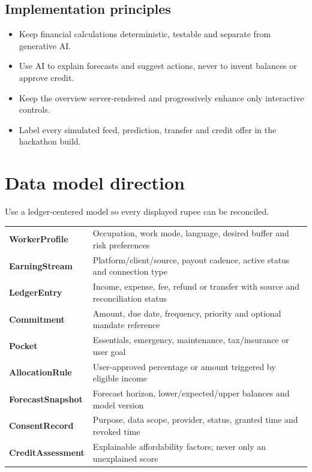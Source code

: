 \documentclass[10pt,a4paper]{article}
\begin{document}
\subsection{Implementation principles}

\begin{itemize}
  \item Keep financial calculations deterministic, testable and separate from generative AI.
  \item Use AI to explain forecasts and suggest actions, never to invent balances or approve credit.
  \item Keep the overview server-rendered and progressively enhance only interactive controls.
  \item Label every simulated feed, prediction, transfer and credit offer in the hackathon build.
\end{itemize}

\newpage
\section{Data model direction}

Use a ledger-centered model so every displayed rupee can be reconciled.

\begin{tabularx}{\textwidth}{>{\bfseries\color{Accent}}p{38mm} X}
WorkerProfile & Occupation, work mode, language, desired buffer and risk preferences \\
EarningStream & Platform/client/source, payout cadence, active status and connection type \\
LedgerEntry & Income, expense, fee, refund or transfer with source and reconciliation status \\
Commitment & Amount, due date, frequency, priority and optional mandate reference \\
Pocket & Essentials, emergency, maintenance, tax/insurance or user goal \\
AllocationRule & User-approved percentage or amount triggered by eligible income \\
ForecastSnapshot & Forecast horizon, lower/expected/upper balances and model version \\
ConsentRecord & Purpose, data scope, provider, status, granted time and revoked time \\
CreditAssessment & Explainable affordability factors; never only an unexplained score \\
\end{tabularx}
\end{document}
